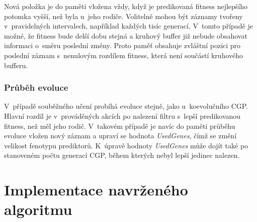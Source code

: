 Nová položka je do paměti vložena vždy, když je predikovaná fitness nejlepšího potomka vyšší, než byla u~jeho rodiče. Volitelně mohou být záznamy tvořeny v~pravidelných intervalech, například každých tisíc generací. V~tomto případě je možné, že fitness bude delší dobu stejná a kruhový buffer již nebude obsahovat informaci o~směru poslední změny. Proto paměť obsahuje zvláštní pozici pro poslední záznam s~nenulovým rozdílem fitness, která není součástí kruhového bufferu.






\subsection{Průběh evoluce}

V~případě souběžného učení probíhá evoluce stejně, jako u~koevolučního CGP. Hlavní rozdíl je v~prováděných akcích po nalezení filtru s~lepší predikovanou fitness, než měl jeho rodič. V~takovém případě je navíc do paměti průběhu evoluce vložen nový záznam a upraví se hodnota \emph{UsedGenes}, čímž se změní velikost fenotypu prediktorů. K~úpravě hodnoty \emph{UsedGenes} může dojít také po stanoveném počtu generací CGP, během kterých nebyl lepší jedinec nalezen.



\chapter{Implementace navrženého algoritmu}
\label{chImplementation}


